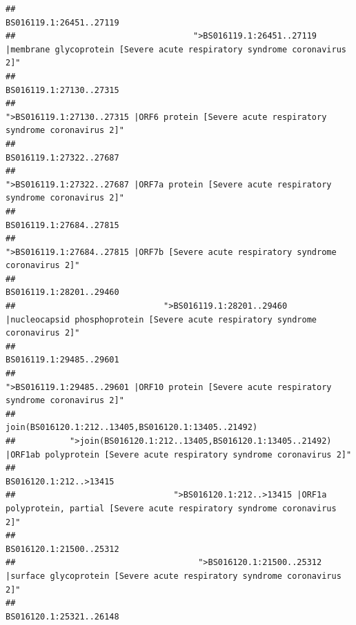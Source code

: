 \documentclass[
]{article}
\begin{document}
\begin{verbatim}
##                                                                                                                BS016119.1:26451..27119 
##                                    ">BS016119.1:26451..27119 |membrane glycoprotein [Severe acute respiratory syndrome coronavirus 2]" 
##                                                                                                                BS016119.1:27130..27315 
##                                             ">BS016119.1:27130..27315 |ORF6 protein [Severe acute respiratory syndrome coronavirus 2]" 
##                                                                                                                BS016119.1:27322..27687 
##                                            ">BS016119.1:27322..27687 |ORF7a protein [Severe acute respiratory syndrome coronavirus 2]" 
##                                                                                                                BS016119.1:27684..27815 
##                                                    ">BS016119.1:27684..27815 |ORF7b [Severe acute respiratory syndrome coronavirus 2]" 
##                                                                                                                BS016119.1:28201..29460 
##                              ">BS016119.1:28201..29460 |nucleocapsid phosphoprotein [Severe acute respiratory syndrome coronavirus 2]" 
##                                                                                                                BS016119.1:29485..29601 
##                                            ">BS016119.1:29485..29601 |ORF10 protein [Severe acute respiratory syndrome coronavirus 2]" 
##                                                                                    join(BS016120.1:212..13405,BS016120.1:13405..21492) 
##           ">join(BS016120.1:212..13405,BS016120.1:13405..21492) |ORF1ab polyprotein [Severe acute respiratory syndrome coronavirus 2]" 
##                                                                                                                 BS016120.1:212..>13415 
##                                ">BS016120.1:212..>13415 |ORF1a polyprotein, partial [Severe acute respiratory syndrome coronavirus 2]" 
##                                                                                                                BS016120.1:21500..25312 
##                                     ">BS016120.1:21500..25312 |surface glycoprotein [Severe acute respiratory syndrome coronavirus 2]" 
##                                                                                                                BS016120.1:25321..26148 

\end{verbatim}
\end{document}
